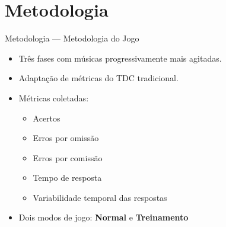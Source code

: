 \documentclass{beamer}
\begin{document}
\section[Metodologia \\ \footnotesize(7–9)]{Metodologia}

\begin{frame}{Metodologia — Metodologia do Jogo}
\justifying

\begin{itemize}
    \item Três fases com músicas progressivamente mais agitadas.
    \item Adaptação de métricas do TDC tradicional.
    \item Métricas coletadas:
    \begin{itemize}
        \item Acertos
        \item Erros por omissão
        \item Erros por comissão
        \item Tempo de resposta
        \item Variabilidade temporal das respostas
    \end{itemize}
    \item Dois modos de jogo: \textbf{Normal} e \textbf{Treinamento}
\end{itemize}

\end{frame}
\end{document}
